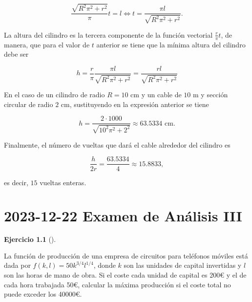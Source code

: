 \documentclass[
  a4paper,
]{scrreport}
\theoremstyle{definition}
\newtheorem{exercise}{Ejercicio}[chapter]
\theoremstyle{remark}
\begin{document}
\begin{tcolorbox}
\[
\frac{\sqrt{R^2\pi^2+r^2}}{\pi}t = l \Leftrightarrow t = \frac{\pi l}{\sqrt{R^2\pi^2+r^2}}.
\]

La altura del cilindro es la tercera componente de la función vectorial
\(\frac{r}{\pi}t\), de manera, que para el valor de \(t\) anterior se
tiene que la mínima altura del cilindro debe ser

\[
h=\frac{r}{\pi}\frac{\pi l}{\sqrt{R^2\pi^2+r^2}} = \frac{rl}{\sqrt{R^2\pi^2+r^2}} 
\]

En el caso de un cilindro de radio \(R=10\) cm y un cable de \(10\) m y
sección circular de radio \(2\) cm, sustituyendo en la expresión
anterior se tiene

\[
h=\frac{2\cdot 1000}{\sqrt{10^2\pi^2+2^2}} \approx 63.5334 \mbox{ cm}.
\]

Finalmente, el número de vueltas que dará el cable alrededor del
cilindro es

\[
\frac{h}{2r} = \frac{63.5334}{4}
\approx 15.8833,
\]

es decir, \(15\) vueltas enteras.

\end{tcolorbox}


\chapter{\texorpdfstring{2023-12-22 Examen de Análisis
III}{2023-12-22  Examen de Análisis III}}\label{examen-de-anuxe1lisis-iii-1}

\begin{exercise}[]\protect\hypertarget{exr-1}{}\label{exr-1}

La función de producción de una empresa de circuitos para teléfonos
móviles está dada por \(f(k,l) = 50k^{3/4}l^{1/4}\), donde \(k\) son las
unidades de capital invertidas y \(l\) son las horas de mano de obra. Si
el coste cada unidad de capital es 200€ y el de cada hora trabajada 50€,
calcular la máxima producción si el coste total no puede exceder los
40000€.

\end{exercise}
\end{document}
